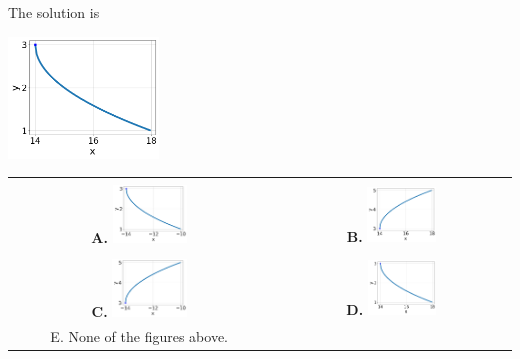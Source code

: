\documentclass{article}[14pt]
\begin{document}
 
 The solution is  
 \begin{center} \includegraphics[width=0.3\textwidth]{../Figures/radicalEquationToGraphAD.png} \end{center}\begin{tabular}{|c|c|} 
\hline 
 & \tabularnewline 
 \textbf{A.} \includegraphics[width=0.3\textwidth]{../Figures/radicalEquationToGraphAA.png} & \textbf{B.} \includegraphics[width=0.3\textwidth]{../Figures/radicalEquationToGraphAB.png} \tabularnewline 
\hline 
 & \tabularnewline 
 \textbf{C.} \includegraphics[width=0.3\textwidth]{../Figures/radicalEquationToGraphAC.png} & \textbf{D.} \includegraphics[width=0.3\textwidth]{../Figures/radicalEquationToGraphAD.png} \tabularnewline 
\hline 
 E. None of the figures above. & \tabularnewline 
\hline 
 \end{tabular} 
 
\end{document}
